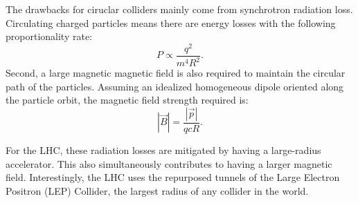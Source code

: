 

 The drawbacks \cite{Ferrario:2020zwm, Andrews:2022nza} for ciruclar colliders mainly come from synchrotron radiation loss. Circulating charged particles means there are energy losses with the following proportionality rate:
\begin{equation}
    P \propto \frac{q^2}{m^4 R^2}.
\end{equation}
Second, a large magnetic magnetic field is also required to maintain the circular path of the particles. Assuming an idealized homogeneous dipole oriented along the particle orbit, the magnetic field strength required is:
\begin{equation}
    |\vec{B}|= \frac{|\vec{p}|}{qcR}.
\end{equation}

For the LHC, these radiation losses are mitigated by having a large-radius accelerator. This also simultaneously contributes to having a larger magnetic field. Interestingly, the LHC uses the repurposed tunnels of the Large Electron Positron (LEP) Collider, the largest radius of any collider in the world.

